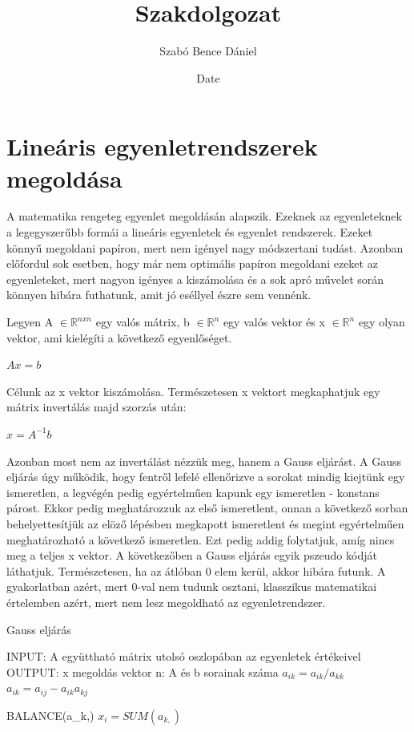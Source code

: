 \documentclass{article}
\title{Szakdolgozat}
\author{Szabó Bence Dániel }
\date{Date}
\theoremstyle{definition}
\begin{document}
\maketitle

\section{Lineáris egyenletrendszerek megoldása}


A matematika rengeteg egyenlet megoldásán alapszik. Ezeknek az egyenleteknek a legegyszerűbb formái a lineáris egyenletek és egyenlet rendszerek. Ezeket könnyű megoldani papíron, mert nem igényel nagy módszertani tudást. Azonban előfordul sok esetben, hogy már nem optimális papíron megoldani ezeket az egyenleteket, mert nagyon igényes a kiszámolása és a sok apró művelet során könnyen hibára futhatunk, amit jó eséllyel észre sem vennénk. 

Legyen A $\in \mathbb{R}^{n x n}$ egy valós mátrix, b $\in \mathbb{R}^{n}$ egy valós vektor és x $\in \mathbb{R}^{n}$ egy olyan vektor, ami kielégíti a következő egyenlőséget.
\begin{center}
    $Ax = b$
\end{center}
Célunk az x vektor kiszámolása. Természetesen x vektort megkaphatjuk egy mátrix invertálás majd szorzás után:
\begin{center}
    $x = A ^{-1}b$
\end{center}
Azonban most nem az invertálást nézzük meg, hanem a Gauss eljárást. A Gauss eljárás úgy működik, hogy fentről lefelé ellenőrizve a sorokat mindig kiejtünk egy ismeretlen, a legvégén pedig egyértelműen kapunk egy ismeretlen - konstans párost. Ekkor pedig meghatározzuk az első ismeretlent, onnan a következő sorban behelyettesítjük az elöző lépésben megkapott ismeretlent és megint egyértelműen meghatározható a következő ismeretlen. Ezt pedig addig folytatjuk, amíg nincs meg a teljes x vektor. A következőben a Gauss eljárás egyik pszeudo kódját láthatjuk. Természetesen, ha az átlóban 0 elem kerül, akkor hibára futunk. A gyakorlatban azért, mert 0-val nem tudunk osztani, klasszikus matematikai értelemben azért, mert nem lesz megoldható az egyenletrendszer.

\begin{algorithm}
\caption{Gauss eljárás}
\begin{algorithmic}
\STATE INPUT: A együttható mátrix utolsó oszlopában az egyenletek értékeivel
\STATE OUTPUT: x megoldás vektor
\STATE n: A és b sorainak száma
\STATE $a_{ik} = a_{ik} / a_{kk}$
\STATE $a_{ik} = a_{ij} - a_{ik} a_{kj}$
\ENDFOR 
\ENDFOR 
\ENDFOR 

BALANCE(a_{k,})
\newline
$ x_i = SUM(a_{k,})$
\ENDFOR
\end{algorithmic}


\end{algorithm}
\newpage
\end{document}
